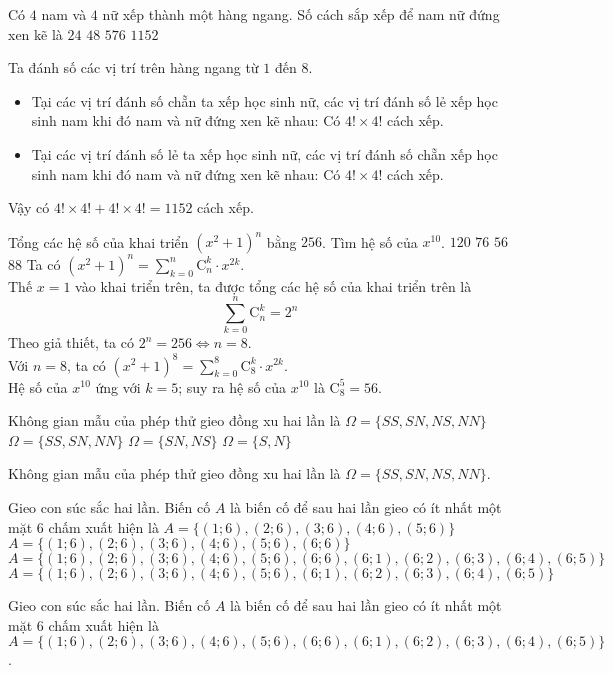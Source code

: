 \begin{ex}%
	 Có $4$ nam và $4$ nữ xếp thành một hàng ngang. Số cách sắp xếp để nam nữ đứng xen kẽ là
	 	\choice
	 {$24$}
	 {$48$}
	 {$576$}
	 {\True $1152$}
	 \loigiai
	 { Ta đánh số các vị trí trên hàng ngang từ $1$ đến $8$.
	 	\begin{itemize}
	 		\item Tại các vị trí đánh số chẵn ta xếp học sinh nữ, các vị trí đánh số lẻ xếp học sinh nam khi đó nam và nữ đứng xen kẽ nhau: Có $4! \times 4!$ cách xếp.
	 		\item Tại các vị trí đánh số lẻ ta xếp học sinh nữ, các vị trí đánh số chẵn xếp học sinh nam khi đó nam và nữ đứng xen kẽ nhau: Có $4! \times 4!$ cách xếp.
	 	\end{itemize}
	 	Vậy có $4!\times 4!+4!\times 4!=1152$ cách xếp.
	 }
\end{ex}

\begin{ex}%
	Tổng các hệ số của khai triển $(x^2+1)^n$ bằng $256$. Tìm hệ số của $x^{10}$.
		\choice
	{$120$}
	{$76$}
	{\True $56$}
	{$88$}
	\loigiai
	{ Ta có $(x^2+1)^n= \sum\limits_{k=0}^n \mathrm{C}_n^k\cdot x^{2k}$.\\
		Thế $x=1$ vào khai triển trên, ta được tổng các hệ số của khai triển trên là
		$$\sum\limits_{k=0}^n \mathrm{C}_n^k =2^n $$
		Theo giả thiết, ta có $2^n=256 \Leftrightarrow n= 8.$\\
		Với $n=8$, ta có $(x^2+1)^8= \sum\limits_{k=0}^8 \mathrm{C}_8^k\cdot x^{2k}$.\\
		Hệ số của $x^{10}$ ứng với $k=5$; suy ra hệ số của $x^{10}$ là $\mathrm{C}_8^5=56.$
	}
\end{ex}

\begin{ex}%
	Không gian mẫu của phép thử gieo đồng xu hai lần là
		\choice
	{\True $\Omega =\{SS,SN,NS,NN\}$}
	{$\Omega =\{SS,SN,NN\}$}
	{$\Omega =\{SN,NS\}$}
	{$\Omega =\{S,N\}$}
	\loigiai
	{	Không gian mẫu của phép thử gieo đồng xu hai lần là $\Omega =\{SS,SN,NS,NN\}$.
		
	}
\end{ex}

\begin{ex}%
	Gieo con súc sắc hai lần. Biến cố $A$ là biến cố để sau hai lần gieo có ít nhất một mặt $6$ chấm xuất hiện là
		\choice
	{$A=\{(1;6),(2;6),(3;6),(4;6),(5;6)\}$}
	{$A=\{(1;6),(2;6),(3;6),(4;6),(5;6),(6;6)\}$}
	{\True $A=\{(1;6),(2;6),(3;6),(4;6),(5;6),(6;6),(6;1),(6;2),(6;3),(6;4),(6;5)\}$}
	{$A=\{(1;6),(2;6),(3;6),(4;6),(5;6),(6;1),(6;2),(6;3),(6;4),(6;5)\}$}
	\loigiai
	{ Gieo con súc sắc hai lần. Biến cố $A$ là biến cố để sau hai lần gieo có ít nhất một mặt $6$ chấm xuất hiện là  $A=\{(1;6),(2;6),(3;6),(4;6),(5;6),(6;6),(6;1),(6;2),(6;3),(6;4),(6;5)\}$.
		
	}
\end{ex}

